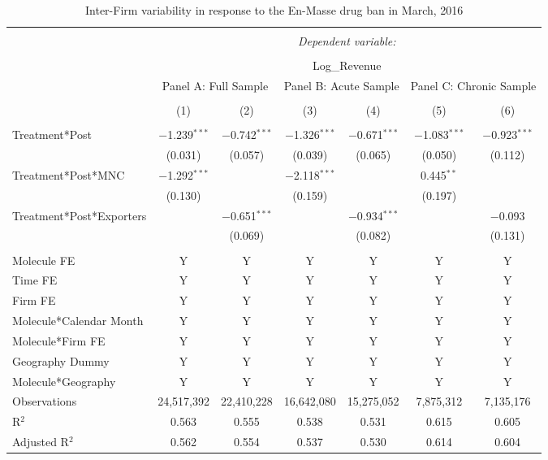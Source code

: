 \documentclass[AER]{AEA}
\theoremstyle{theorem}
\begin{document}
\begin{table}[h!] \centering
	\caption{Inter-Firm variability in response to the En-Masse drug ban in March, 2016} 
	\label{Table-R-4} 
	\footnotesize
\begin{tabular}{@{\extracolsep{3pt}}lcccccc} 
	\\[-1.8ex]\hline 
	\hline \\[-1.8ex] 
	& \multicolumn{6}{c}{\textit{Dependent variable:}} \\ 
	\cline{2-7} 
	\\[-1.8ex] & \multicolumn{6}{c}{Log\_Revenue} \\ 
	& \multicolumn{2}{c}{Panel A: Full Sample} & \multicolumn{2}{c}{Panel B: Acute Sample} & \multicolumn{2}{c}{Panel C: Chronic Sample} \\ 
	\\[-1.8ex] & (1) & (2) & (3) & (4) & (5) & (6)\\ 
	\hline \\[-1.8ex] 
	Treatment*Post & $-$1.239$^{***}$ & $-$0.742$^{***}$ & $-$1.326$^{***}$ & $-$0.671$^{***}$ & $-$1.083$^{***}$ & $-$0.923$^{***}$ \\ 
	& (0.031) & (0.057) & (0.039) & (0.065) & (0.050) & (0.112) \\ 
	Treatment*Post*MNC & $-$1.292$^{***}$ &  & $-$2.118$^{***}$ &  & 0.445$^{**}$ &  \\ 
	& (0.130) &  & (0.159) &  & (0.197) &  \\ 
	Treatment*Post*Exporters &  & $-$0.651$^{***}$ &  & $-$0.934$^{***}$ &  & $-$0.093 \\ 
	&  & (0.069) &  & (0.082) &  & (0.131) \\ 
	\hline \\[-1.8ex] 
	Molecule FE & Y & Y & Y & Y & Y & Y \\ 
	Time FE & Y & Y & Y & Y & Y & Y \\ 
	Firm FE & Y & Y & Y & Y & Y & Y \\ 
	Molecule*Calendar Month & Y & Y & Y & Y & Y & Y \\ 
	Molecule*Firm FE & Y & Y & Y & Y & Y & Y \\ 
	Geography Dummy & Y & Y & Y & Y & Y & Y \\ 
	Molecule*Geography & Y & Y & Y & Y & Y & Y \\ 
	Observations & 24,517,392 & 22,410,228 & 16,642,080 & 15,275,052 & 7,875,312 & 7,135,176 \\ 
	R$^{2}$ & 0.563 & 0.555 & 0.538 & 0.531 & 0.615 & 0.605 \\ 
	Adjusted R$^{2}$ & 0.562 & 0.554 & 0.537 & 0.530 & 0.614 & 0.604 \\ 

\end{tabular}
\end{table}
\end{document}
